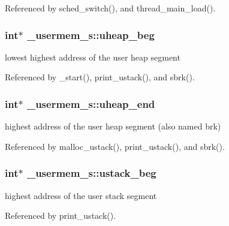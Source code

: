 Referenced by sched\-\_\-switch(), and thread\-\_\-main\-\_\-load().

\hypertarget{struct__usermem__s_a0ada31d8a3c5cd0a5d82fe3b0ea7bbe7}{
\subsubsection[{uheap\-\_\-beg}]{\setlength{\rightskip}{0pt plus 5cm}int$\ast$ \-\_\-usermem\-\_\-s\-::uheap\-\_\-beg}}\label{struct__usermem__s_a0ada31d8a3c5cd0a5d82fe3b0ea7bbe7}


lowest highest address of the user heap segment 



Referenced by \-\_\-start(), print\-\_\-ustack(), and sbrk().

\hypertarget{struct__usermem__s_afc2d87db58cb56804172f98d124d3c05}{
\subsubsection[{uheap\-\_\-end}]{\setlength{\rightskip}{0pt plus 5cm}int$\ast$ \-\_\-usermem\-\_\-s\-::uheap\-\_\-end}}\label{struct__usermem__s_afc2d87db58cb56804172f98d124d3c05}


highest address of the user heap segment (also named brk) 



Referenced by malloc\-\_\-ustack(), print\-\_\-ustack(), and sbrk().

\hypertarget{struct__usermem__s_a2fd1c0d0e8502f93210c3a30d3746d06}{
\subsubsection[{ustack\-\_\-beg}]{\setlength{\rightskip}{0pt plus 5cm}int$\ast$ \-\_\-usermem\-\_\-s\-::ustack\-\_\-beg}}\label{struct__usermem__s_a2fd1c0d0e8502f93210c3a30d3746d06}


highest address of the user stack segment 



Referenced by print\-\_\-ustack().

